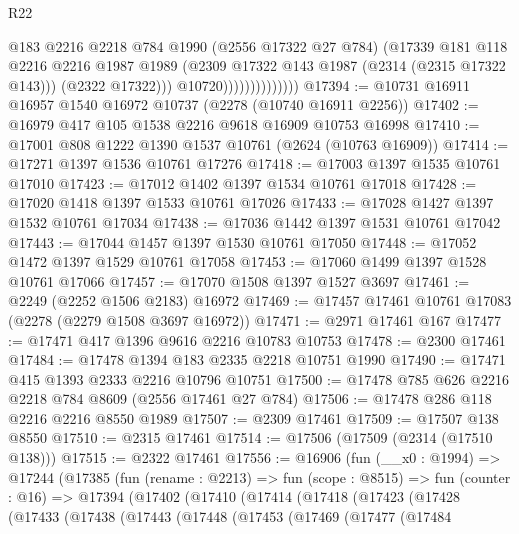 \begin{lexlean}{R22}
\begin{coremodule}
                                  @183
                                  @2216
                                  @2218
                                  @784
                                  @1990
                                  (@2556 @17322 @27 @784)
                                  (@17339
                                    @181
                                    @118
                                    @2216
                                    @2216
                                    @1987
                                    @1989
                                    (@2309 @17322 @143 @1987 (@2314 (@2315 @17322 @143)))
                                    (@2322 @17322)))
                                @10720))))))))))))))
@17394 := @10731 @16911 @16957 @1540 @16972 @10737 (@2278 (@10740 @16911 @2256))
@17402 := @16979 @417 @105 @1538 @2216 @9618 @16909 @10753 @16998
@17410 := @17001 @808 @1222 @1390 @1537 @10761 (@2624 (@10763 @16909))
@17414 := @17271 @1397 @1536 @10761 @17276
@17418 := @17003 @1397 @1535 @10761 @17010
@17423 := @17012 @1402 @1397 @1534 @10761 @17018
@17428 := @17020 @1418 @1397 @1533 @10761 @17026
@17433 := @17028 @1427 @1397 @1532 @10761 @17034
@17438 := @17036 @1442 @1397 @1531 @10761 @17042
@17443 := @17044 @1457 @1397 @1530 @10761 @17050
@17448 := @17052 @1472 @1397 @1529 @10761 @17058
@17453 := @17060 @1499 @1397 @1528 @10761 @17066
@17457 := @17070 @1508 @1397 @1527 @3697
@17461 := @2249 (@2252 @1506 @2183) @16972
@17469 := @17457 @17461 @10761 @17083 (@2278 (@2279 @1508 @3697 @16972))
@17471 := @2971 @17461 @167
@17477 := @17471 @417 @1396 @9616 @2216 @10783 @10753
@17478 := @2300 @17461
@17484 := @17478 @1394 @183 @2335 @2218 @10751 @1990
@17490 := @17471 @415 @1393 @2333 @2216 @10796 @10751
@17500 := @17478 @785 @626 @2216 @2218 @784 @8609 (@2556 @17461 @27 @784)
@17506 := @17478 @286 @118 @2216 @2216 @8550 @1989
@17507 := @2309 @17461
@17509 := @17507 @138 @8550
@17510 := @2315 @17461
@17514 := @17506 (@17509 (@2314 (@17510 @138)))
@17515 := @2322 @17461
@17556 := @16906
    (fun (__x0 : @1994) =>
    @17244
      (@17385
        (fun (rename : @2213) =>
        fun (scope : @8515) =>
        fun (counter : @16) =>
        @17394
          (@17402
            (@17410
              (@17414
                (@17418
                  (@17423
                    (@17428
                      (@17433
                        (@17438
                          (@17443
                            (@17448
                              (@17453
                                (@17469
                                  (@17477
                                    (@17484

\end{coremodule}
\end{lexlean}
